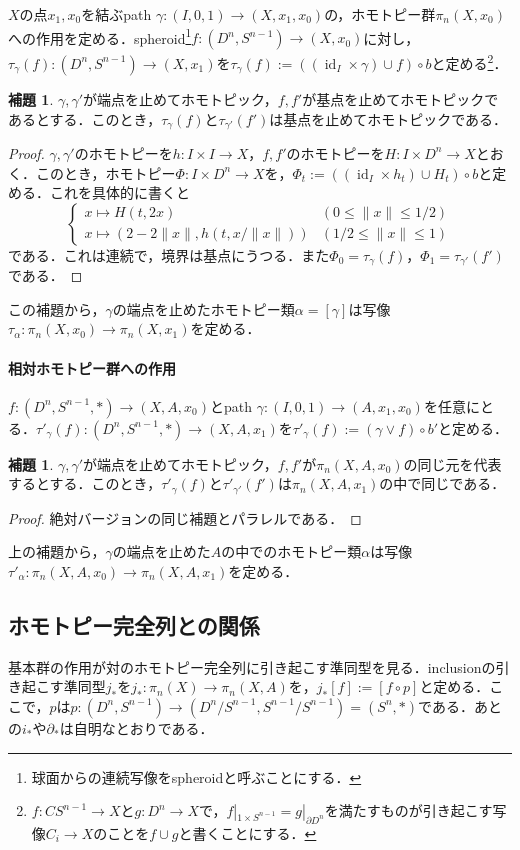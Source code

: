 \documentclass[a4paper,11pt]{jsarticle}
\theoremstyle{definition}
\newtheorem{lem}[thm]{補題}
\DeclareMathOperator{\id}{\mathrm{id}}
\begin{document}
$X$の点$x_1,x_0$を結ぶpath $\gamma\colon (I,0,1)\to (X,x_1,x_0)$の，ホモトピー群$\pi_n(X,x_0)$への作用を定める．spheroid\footnote{球面からの連続写像をspheroidと呼ぶことにする．}$f\colon (D^n,S^{n-1})\to (X,x_0)$に対し，$\tau_\gamma (f)\colon (D^n,S^{n-1})\to (X,x_1)$を$\tau_\gamma(f):=((\id_I\times \gamma)\cup f)\circ b$と定める\footnote{$f\colon CS^{n-1}\to X$と$g\colon D^n\to X$で，$f|_{1\times S^{n-1}}=g|_{\partial D^n}$を満たすものが引き起こす写像$C_i\to X$のことを$f\cup g$と書くことにする．}．
\begin{lem}
  $\gamma,\gamma'$が端点を止めてホモトピック，$f,f'$が基点を止めてホモトピックであるとする．このとき，$\tau_\gamma(f)$と$\tau_{\gamma'}(f')$は基点を止めてホモトピックである．
\end{lem}
\begin{proof}
  $\gamma,\gamma'$のホモトピーを$h\colon I\times I\to X$，$f,f'$のホモトピーを$H\colon I\times D^n\to X$とおく．このとき，ホモトピー$\Phi\colon I\times D^n\to X$を，$\Phi_t:=((\id_I\times h_t)\cup H_t)\circ b$と定める．これを具体的に書くと
  \[\begin{cases}
    x\mapsto H(t,2x)&(0\le \|x\|\le 1/2)\\
    x\mapsto (2-2\|x\|,h(t,x/\|x\|))&(1/2\le\|x\|\le 1)
  \end{cases}
  \]である．これは連続で，境界は基点にうつる．また$\Phi_0=\tau_\gamma(f)$，$\Phi_1=\tau_{\gamma'}(f')$である．
\end{proof}
この補題から，$\gamma$の端点を止めたホモトピー類$\alpha=[\gamma]$は写像$\tau_\alpha \colon\pi_n(X,x_0)\to \pi_n(X,x_1)$を定める．
\paragraph{相対ホモトピー群への作用}
$f\colon(D^n,S^{n-1},*)\to (X,A,x_0)$とpath $\gamma\colon (I,0,1)\to (A,x_1,x_0)$を任意にとる．$\tau'_\gamma(f)\colon (D^n,S^{n-1},*)\to (X,A,x_1)$を$\tau'_\gamma(f):=(\gamma\vee f)\circ b'$と定める．
\begin{lem}
  $\gamma,\gamma'$が端点を止めてホモトピック，$f,f'$が$\pi_n(X,A,x_0)$の同じ元を代表するとする．このとき，$\tau'_\gamma(f)$と$\tau'_{\gamma'}(f')$は$\pi_n(X,A,x_1)$の中で同じである．
\end{lem}
\begin{proof}
  絶対バージョンの同じ補題とパラレルである．
\end{proof}
上の補題から，$\gamma$の端点を止めた$A$の中でのホモトピー類$\alpha$は写像$\tau'_\alpha\colon\pi_n(X,A,x_0)\to \pi_n(X,A,x_1)$を定める．
\subsection{ホモトピー完全列との関係}
基本群の作用が対のホモトピー完全列に引き起こす準同型を見る．inclusionの引き起こす準同型$j_*$を$j_*\colon\pi_n(X)\to \pi_n(X,A)$を，$j_*[f]:=[f\circ p]$と定める．ここで，$p$は$p\colon (D^n,S^{n-1})\to(D^n/S^{n-1},S^{n-1}/S^{n-1})=(S^n,*)$である．あとの$i_*$や$\partial_*$は自明なとおりである．
\end{document}
